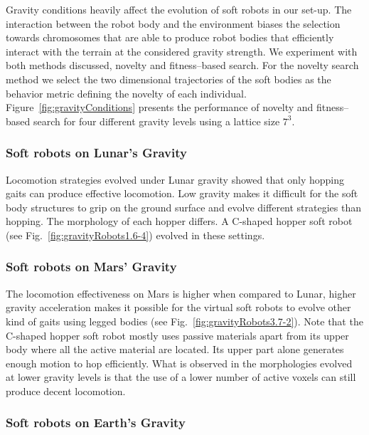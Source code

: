 \documentclass{sig-alternate}
\begin{document}
Gravity conditions heavily affect the evolution of soft robots in our set-up. The interaction between the robot body and the environment biases the selection towards chromosomes that are able to produce robot bodies that efficiently interact with the terrain at the considered gravity strength. We experiment with both methods discussed, novelty and fitness--based search. For the novelty search method we select the two dimensional trajectories of the soft bodies as the behavior metric defining the novelty of each individual. Figure~\ref{fig:gravityConditions} presents the performance of novelty and fitness--based search for four different gravity levels using a lattice size $7^3$.

\subsubsection*{Soft robots on Lunar's Gravity}

Locomotion strategies evolved under Lunar gravity showed that only hopping gaits can produce effective locomotion. Low gravity makes it difficult for the soft body structures to grip on the ground surface and evolve different strategies than hopping. The morphology of each hopper differs. A C-shaped hopper soft robot (see Fig.~\ref{fig:gravityRobots1.6-4}) evolved in these settings.

\subsubsection*{Soft robots on Mars' Gravity}

The locomotion effectiveness on Mars is higher when compared to Lunar, higher gravity acceleration makes it possible for the virtual soft robots to evolve other kind of gaits using legged bodies (see Fig.~\ref{fig:gravityRobots3.7-2}). Note that the C-shaped hopper soft robot mostly uses passive materials apart from its upper body where all the active material are located. Its upper part alone generates enough motion to hop efficiently. What is observed in the morphologies evolved at lower gravity levels is that the use of a lower number of active voxels can still produce decent locomotion.

\subsubsection*{Soft robots on Earth's Gravity}
\end{document}
